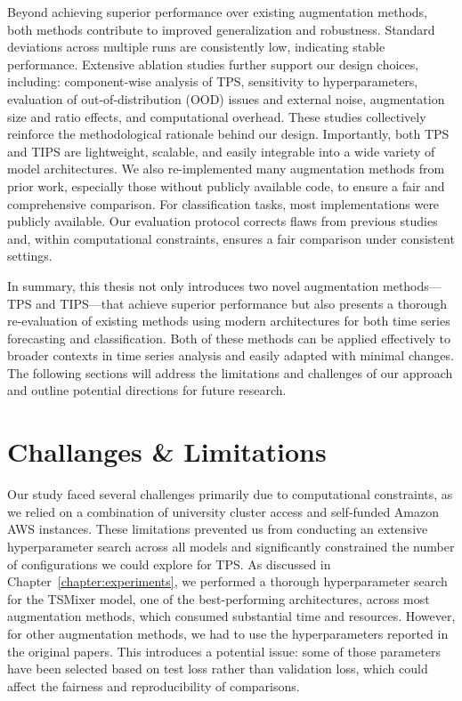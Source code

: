 Beyond achieving superior performance over existing augmentation methods, both methods contribute to improved generalization and robustness. Standard deviations across multiple runs are consistently low, indicating stable performance. Extensive ablation studies further support our design choices, including: component-wise analysis of TPS, sensitivity to hyperparameters, evaluation of out-of-distribution (OOD) issues and external noise, augmentation size and ratio effects, and computational overhead. These studies collectively reinforce the methodological rationale behind our design. Importantly, both TPS and TIPS are lightweight, scalable, and easily integrable into a wide variety of model architectures.
We also re-implemented many augmentation methods from prior work, especially those without publicly available code, to ensure a fair and comprehensive comparison. For classification tasks, most implementations were publicly available. Our evaluation protocol corrects flaws from previous studies and, within computational constraints, ensures a fair comparison under consistent settings.

In summary, this thesis not only introduces two novel augmentation methods—TPS and TIPS—that achieve superior performance but also presents a thorough re-evaluation of existing methods using modern architectures for both time series forecasting and classification.
Both of these methods can be applied effectively to broader contexts in time series analysis and easily adapted with minimal changes. The following sections will address the limitations and challenges of our approach and outline potential directions for future research.


\section{Challanges \& Limitations} \label{sec:limitations}

Our study faced several challenges primarily due to computational constraints, as we relied on a combination of university cluster access and self-funded Amazon AWS instances. These limitations prevented us from conducting an extensive hyperparameter search across all models and significantly constrained the number of configurations we could explore for TPS. As discussed in Chapter~\ref{chapter:experiments}, we performed a thorough hyperparameter search for the TSMixer model, one of the best-performing architectures, across most augmentation methods, which consumed substantial time and resources. However, for other augmentation methods, we had to use the hyperparameters reported in the original papers. This introduces a potential issue: some of those parameters have been selected based on test loss rather than validation loss, which could affect the fairness and reproducibility of comparisons.

